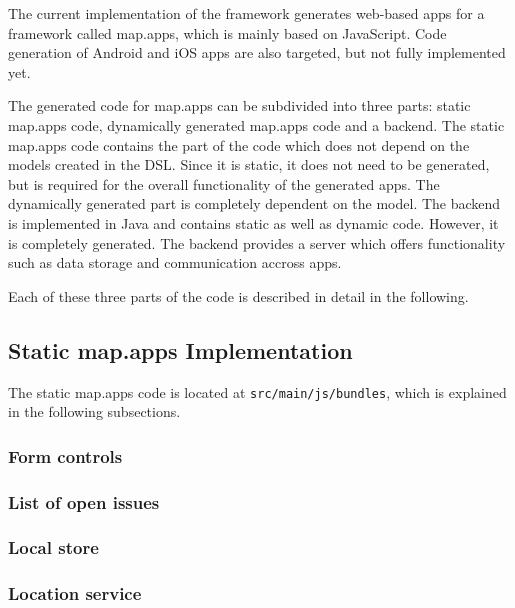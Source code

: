 
The current implementation of the \MD framework generates web-based apps for a framework called map.apps, which is mainly based on JavaScript. Code generation of Android and iOS apps are also targeted, but not fully implemented yet.

The generated code for map.apps can be subdivided into three parts: static map.apps code, dynamically generated map.apps code and a backend. The static map.apps code contains the part of the code which does not depend on the models created in the \MD DSL. Since it is static, it does not need to be generated, but is required for the overall functionality of the generated apps. The dynamically generated part is completely dependent on the model. The backend is implemented in Java and contains static as well as dynamic code. However, it is completely generated. The backend provides a server which offers functionality such as data storage and communication accross apps.

Each of these three parts of the code is described in detail in the following.


\subsection{Static map.apps Implementation}

The static map.apps code is located at \texttt{src/main/js/bundles}, which is explained in the following subsections.

\subsubsection{Form controls}

\subsubsection{List of open issues}

\subsubsection{Local store}

\subsubsection{Location service}


